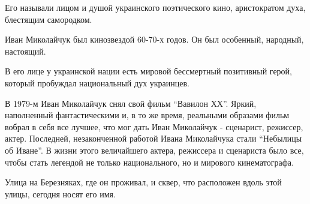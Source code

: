 Его называли лицом и душой украинского поэтического кино, аристократом духа,
блестящим самородком.

Иван Миколайчук был кинозвездой 60-70-х годов. Он был особенный, народный,
настоящий.

В его лице у украинской нации есть мировой бессмертный позитивный герой,
который пробуждал национальный дух украинцев.

В 1979-м Иван Миколайчук снял свой фильм \enquote{Вавилон ХХ}. Яркий, наполненный
фантастическими и, в то же время, реальными образами фильм вобрал в себя все
лучшее, что мог дать Иван Миколайчук - сценарист, режиссер, актер. Последней,
незаконченной работой Ивана Миколайчука стали \enquote{Небылицы об Иване}. В жизни
этого величайшего актера, режиссера и сценариста было все, чтобы стать легендой
не только национального, но и мирового кинематографа.

Улица на Березняках, где он проживал, и сквер, что расположен вдоль этой
улицы, сегодня носят его имя.
